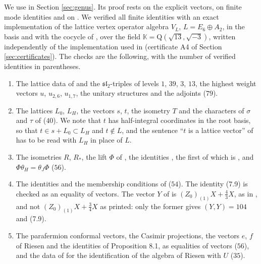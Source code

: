 \documentclass[leqno]{article}
\newcommand{\K}{\ensuremath{\mathbb{K}}}
\newcommand{\Q}{\mathrm{Q}}
\numberwithin{equation}{section}
\begin{document}
We use \cite[Theorem 7.3]{DJX26} in Section \ref{sec:genus}. Its proof rests on the explicit vectors, on finite mode identities and on \cite[Lemma 7.1]{DJX26}. We verified all finite identities with an exact implementation of the lattice vertex operator algebra $V_L$, $L = E_6 \oplus A_2$, in the basis and with the cocycle of \cite[Section 4.1]{DJX26}, over the field $\K = \Q(\sqrt{13},\sqrt{-3})$, written independently of the implementation used in \cite{Arh26} (certificate A4 of Section \ref{sec:certificates}). The checks are the following, with the number of verified identities in parentheses.
\begin{enumerate}
\item The lattice data of \cite[Sections 4.1--4.4]{DJX26} and the $\mathfrak{sl}_2$-triples of levels $1$, $39$, $3$, $13$, the highest weight vectors $u$, $u_{2,6}$, $u_{1,7}$, the unitary structures and the adjoints ($79$).
\item The lattices $L_0$, $L_H$, the vectors $s$, $t$, the isometry $T$ and the characters of $\sigma$ and $\tau$ of \cite[Section 5]{DJX26} ($40$). We note that $t$ has half-integral coordinates in the root basis, so that $t \in s+L_0 \subset L_H$ and $t \notin L$, and the sentence ``$t$ is a lattice vector'' of \cite[Table 1]{DJX26} has to be read with $L_H$ in place of $L$.
\item The isometries $R$, $R_*$, the lift $\Phi$ of \cite[(6.13)]{DJX26}, the identities \cite[(6.14) and (6.15)]{DJX26}, the first of which is \cite[Proposition 6.2]{DJX26}, and $\Phi\theta_H = \theta_J\Phi$ ($56$).
\item The identities \cite[(7.6), (7.7), (7.9), (7.10), (7.11)]{DJX26} and the membership conditions of \cite[Proposition 7.2]{DJX26} ($54$). The identity (7.9) is checked as an equality of vectors. The vector $Y$ of \cite[(7.8)]{DJX26} is $(Z_0)_{(1)}X+\frac43X$, as in \cite[Appendix A.2]{DJX26}, and not $(Z_0)_{(1)}X+\frac34X$ as printed: only the former gives $(Y,Y) = 104$ and (7.9).
\item The parafermion conformal vectors, the Casimir projections, the vectors $e$, $f$ of Riesen and the identities \cite[(4.19)--(4.22), (8.1), (8.2), (8.4)]{DJX26} of Proposition 8.1, as equalities of vectors ($56$), and the data of \cite[Proposition 4.1 and Appendix A.3]{DJX26} for the identification of the algebra of Riesen with $U$ ($35$).
\end{enumerate}
\end{document}
